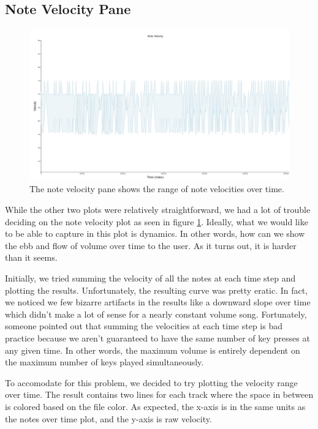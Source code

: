 \documentclass[journal]{vgtc}                %
\begin{document}
\subsection{Note Velocity Pane}

\begin{figure}[h]
  \centering
  \includegraphics[width=\columnwidth]{note-velocity-single-track}
  \caption{The note velocity pane shows the range of note velocities over time.}
  \label{fig:note-velocity}
\end{figure}

While the other two plots were relatively straightforward, we had a lot of
trouble deciding on the note velocity plot as seen in figure \ref{fig:note-velocity}.
Ideally, what we would like to be able to capture in this plot is dynamics. In
other words, how can we show the ebb and flow of volume over time to the user.
As it turns out, it is harder than it seems.

Initially, we tried summing the velocity of all the notes at each time step and
plotting the results. Unfortunately, the resulting curve was pretty eratic. In
fact, we noticed we few bizarre artifacts in the results like a downward
slope over time which didn't make a lot of sense for a nearly constant
volume song. Fortunately, someone pointed out that summing the velocities at
each time step is bad practice because we aren't guaranteed to have the same
number of key presses at any given time. In other words, the maximum volume
is entirely dependent on the maximum number of keys played simultaneously.

To accomodate for this problem, we decided to try plotting the velocity range
over time. The result contains two lines for each track where the space in
between is colored based on the file color. As expected, the x-axis is in the
same units as the notes over time plot, and the y-axis is raw velocity.
\end{document}
